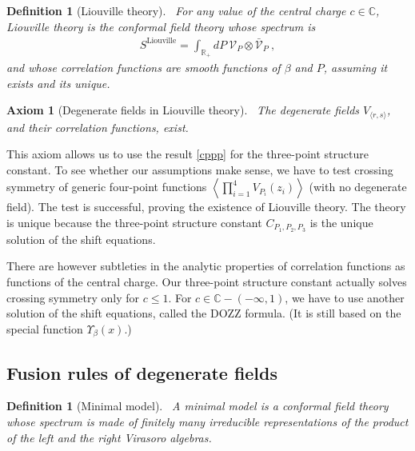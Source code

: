 \documentclass[12pt, a4paper]{article}
\theoremstyle{break}
\newtheorem{hyp}[exo]{Axiom}
\newtheorem{defn}[exo]{Definition}
\begin{document}
\begin{defn}[Liouville theory]
 ~\label{def:liou}
 For any value of the central charge $c\in\mathbb{C}$, Liouville theory is the conformal field theory whose spectrum is 
 \begin{align}
  S^\mathrm{Liouville} 
= \int_{\mathbb{R}_+}  dP\ \mathcal V_P \otimes 
   \bar{\mathcal V}_P\ , 
   \label{eq:sl}
 \end{align}
and whose correlation functions are smooth functions of $\beta$ and $P$, assuming it exists and its unique.
\end{defn}
\begin{hyp}[Degenerate fields in Liouville theory]
 ~\label{hyp:degl}
 The degenerate fields $V_{\langle r, s\rangle}$, and their correlation functions, exist. 
\end{hyp}
This axiom allows us to use the result \eqref{cppp} for the three-point structure constant. To see whether our assumptions make sense, we have to test crossing symmetry of generic four-point functions $\left<\prod_{i=1}^4 V_{P_i}(z_i)\right>$ (with no degenerate field). The test is successful, proving the existence of Liouville theory. The theory is unique because the three-point structure constant $C_{P_1,P_2,P_3}$ is the unique solution of the shift equations. 

There are however subtleties in the analytic properties of correlation functions as functions of the central charge. Our three-point structure constant actually solves crossing symmetry only for $c\leq 1$. For $c\in \mathbb{C}-(-\infty, 1)$, we have to use another solution of the shift equations, called the DOZZ formula. (It is still based on the special function $\Upsilon_\beta(x)$.)

\subsection{Fusion rules of degenerate fields}

\begin{defn}[Minimal model]
 ~\label{def:mm}
 A minimal model is a conformal field theory whose spectrum is made of finitely many irreducible representations of the product of the left and the right Virasoro algebras.
\end{defn}
\end{document}
